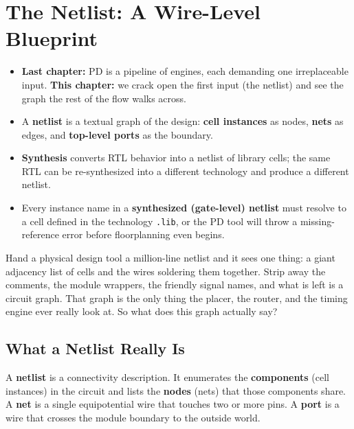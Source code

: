 \chapter{The Netlist: A Wire-Level Blueprint}

\begin{tldr}
\begin{itemize}
  \item \textbf{Last chapter:} PD is a pipeline of engines, each demanding one irreplaceable input. \textbf{This chapter:} we crack open the first input (the netlist) and see the graph the rest of the flow walks across.
  \item A \textbf{netlist} is a textual graph of the design: \textbf{cell instances} as nodes, \textbf{nets} as edges, and \textbf{top-level ports} as the boundary.
  \item \textbf{Synthesis} converts RTL behavior into a netlist of library cells; the same RTL can be re-synthesized into a different technology and produce a different netlist.
  \item Every instance name in a \textbf{synthesized (gate-level) netlist} must resolve to a cell defined in the technology \texttt{.lib}, or the PD tool will throw a missing-reference error before floorplanning even begins.
\end{itemize}
\end{tldr}

\begin{hook}
Hand a physical design tool a million-line netlist and it sees one thing: a giant adjacency list of cells and the wires soldering them together. Strip away the comments, the module wrappers, the friendly signal names, and what is left is a circuit graph. That graph is the only thing the placer, the router, and the timing engine ever really look at. So what does this graph actually say?
\end{hook}

\section{What a Netlist Really Is}

A \textbf{netlist} is a connectivity description. It enumerates the \textbf{components} (cell instances) in the circuit and lists the \textbf{nodes} (nets) that those components share. A \textbf{net} is a single equipotential wire that touches two or more pins. A \textbf{port} is a wire that crosses the module boundary to the outside world.

